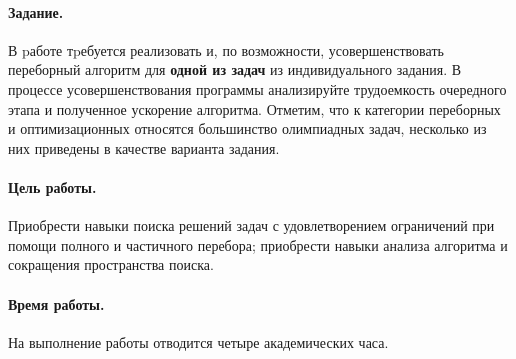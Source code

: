 \documentclass[12pt, openany, oneside]{book} %
\begin{document}
\paragraph{Задание.} В pаботе тpебуется реализовать и, по возможности, усовершенствовать переборный алгоритм для {\bf одной из задач} из индивидуального задания. В процессе усовершенствования программы анализируйте трудоемкость очередного этапа и полученное ускорение алгоритма. Отметим, что к категории переборных и оптимизационных относятся большинство олимпиадных задач, несколько из них приведены в качестве варианта задания.

\paragraph{Цель работы.} Приобрести навыки поиска решений задач с удовлетворением ограничений при помощи полного и частичного перебора; приобрести навыки анализа алгоритма и сокращения пространства поиска.

\paragraph{Время работы.} На выполнение работы отводится четыре академических часа.
\end{document}
